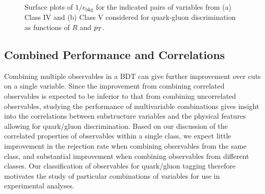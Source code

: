 %
\begin{figure}
\centering
{}
\caption{Surface plots of $1/\epsilon_\text{bkg}$ for the indicated pairs of variables from (a) Class IV and (b) Class V considered for
  quark-gluon discrimination as functions of $R$ and $p_T$. }
\label{fig:qg_surface_pairA}
\end{figure}
%


\subsection{Combined Performance and Correlations}\label{sec:qg_combi}
Combining multiple observables in a BDT can give further improvement over cuts on a single variable. Since the improvement from combining correlated observables is expected to be inferior to that from combining uncorrelated observables, studying the performance of multivariable combinations gives insight into the correlations between substructure variables and the physical  
features allowing for quark/gluon discrimination. Based on our discussion of the correlated properties
of observables within a single class, we expect little improvement in the rejection rate when combining observables from the same class,
and substantial improvement when combining observables from different classes.  Our classification of observables for quark/gluon tagging  therefore motivates the study of
particular combinations of variables for use in experimental analyses.
 
